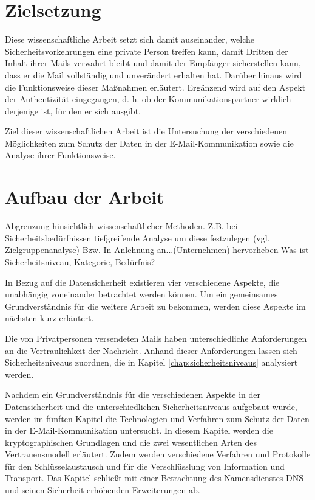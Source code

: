 \documentclass  [paper=a4,
				fontsize=12pt,
				listof=totoc,
				bibliography=totoc
				]{scrreprt}
\begin{document}
		\section{Zielsetzung}
		Diese wissenschaftliche Arbeit setzt sich damit auseinander, welche Sicherheitsvorkehrungen eine private Person treffen kann, damit Dritten der Inhalt ihrer Mails verwahrt bleibt und damit der Empfänger sicherstellen kann, dass er die Mail vollständig und unverändert erhalten hat. Darüber hinaus wird die Funktionsweise dieser Maßnahmen erläutert. Ergänzend wird auf den Aspekt der Authentizität eingegangen, d. h. ob der Kommunikationspartner wirklich derjenige ist, für den er sich ausgibt.
		
		Ziel dieser wissenschaftlichen Arbeit ist die Untersuchung der verschiedenen Möglichkeiten zum Schutz der Daten in der E-Mail-Kommunikation sowie die Analyse ihrer Funktionsweise. 
		
		\section{Aufbau der Arbeit}
		\color{darkred}
		Abgrenzung hinsichtlich wissenschaftlicher Methoden.
		Z.B. bei Sicherheitsbedürfnissen tiefgreifende Analyse um diese festzulegen (vgl. Zielgruppenanalyse)
		Bzw. In Anlehnung an...(Unternehmen) hervorheben
		Was ist Sicherheitsniveau, Kategorie, Bedürfnis?
		\color{black}
		
		In Bezug auf die Datensicherheit existieren vier verschiedene Aspekte, die unabhängig voneinander betrachtet werden können. Um ein gemeinsames Grundverständnis für die weitere Arbeit zu bekommen, werden diese Aspekte im nächsten kurz erläutert.
		
		Die von Privatpersonen versendeten Mails haben unterschiedliche Anforderungen an die Vertraulichkeit der Nachricht. Anhand dieser Anforderungen lassen sich Sicherheitsniveaus zuordnen, die in Kapitel \ref{chap:sicherheitsniveaus} analysiert werden.
		
		Nachdem ein Grundverständnis für die verschiedenen Aspekte in der Datensicherheit und die unterschiedlichen Sicherheitsniveaus aufgebaut wurde, werden im fünften Kapitel die Technologien und Verfahren zum Schutz der Daten in der E-Mail-Kommunikation untersucht. In diesem Kapitel werden die kryptographischen Grundlagen und die zwei wesentlichen Arten des Vertrauensmodell erläutert. Zudem werden verschiedene Verfahren und Protokolle für den Schlüsselaustausch und für die Verschlüsslung von Information und Transport. Das Kapitel schließt mit einer Betrachtung des 
		Namensdienstes DNS und seinen Sicherheit erhöhenden Erweiterungen ab.
		
\end{document}
